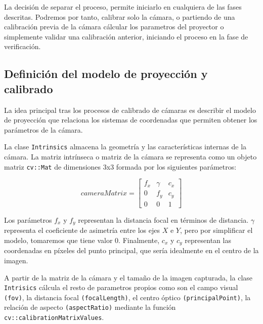 La decisión de separar el proceso, permite iniciarlo en cualquiera de las fases descritas. Podremos por tanto, calibrar solo la cámara, o partiendo de una calibración previa de la cámara cálcular los parametros del proyector o simplemente validar una calibración anterior, iniciando el proceso en la fase de verificación.  


\subsection{Definición del modelo de proyección y calibrado}
La idea principal tras los procesos de calibrado de cámaras es describir el modelo de proyección que relaciona los sistemas de coordenadas que permiten obtener los parámetros de la cámara. 

La clase \texttt{Intrinsics} almacena la geometría y las características internas de la cámara. La matriz intrínseca o matriz de la cámara se representa como un objeto matriz \texttt{cv::Mat} de dimensiones 3x3 formada por los siguientes parámetros:

\begin{equation}
cameraMatrix=
\begin{bmatrix}
f_{x} & \gamma & c_{x} \\
0    & f_{y}   & c_{y} \\
0    & 0      & 1
\end{bmatrix}
\end{equation}

Los parámetros $f_{x}$ y $f_{y}$ representan la distancia focal en términos de distancia. $\gamma$ representa el coeficiente de asimetría entre los ejes $X$ e $Y$, pero por simplificar el modelo, tomaremos que tiene valor 0. Finalmente, $c_{x}$ y $c_{y}$ representan las coordenadas en píxeles del punto principal, que sería idealmente en el centro de la imagen.

A partir de la matriz de la cámara y el tamaño de la imagen capturada, la clase \texttt{Intrisics} cálcula el resto de parametros propios como son el campo visual \texttt{(fov)}, la distancia focal \texttt{(focalLength)}, el centro óptico \texttt{(principalPoint)}, la relación de aspecto \texttt{(aspectRatio)} mediante la función \texttt{cv::calibrationMatrixValues}. 

